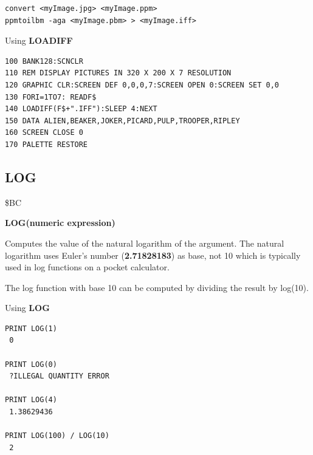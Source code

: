 \begin{description}[leftmargin=2cm,style=nextline]
\begin{verbatim}
convert <myImage.jpg> <myImage.ppm>
ppmtoilbm -aga <myImage.pbm> > <myImage.iff>
\end{verbatim}

\item [Example:] Using {\bf LOADIFF}
\begin{tcolorbox}[colback=black,coltext=white]
\verbatimfont{\codefont}
\begin{verbatim}
100 BANK128:SCNCLR
110 REM DISPLAY PICTURES IN 320 X 200 X 7 RESOLUTION
120 GRAPHIC CLR:SCREEN DEF 0,0,0,7:SCREEN OPEN 0:SCREEN SET 0,0
130 FORI=1TO7: READF$
140 LOADIFF(F$+".IFF"):SLEEP 4:NEXT
150 DATA ALIEN,BEAKER,JOKER,PICARD,PULP,TROOPER,RIPLEY
160 SCREEN CLOSE 0
170 PALETTE RESTORE
\end{verbatim}
\end{tcolorbox}
\end{description}


\newpage
\subsection{LOG}
\begin{description}[leftmargin=2cm,style=nextline]
\item [Token:] \$BC
\item [Format:] {\bf LOG(numeric expression)}
\item [Usage:] Computes
               the value of the natural logarithm of the argument.
               The natural logarithm uses
               Euler's number ({\bf 2.71828183}) as base,
               not 10 which is typically used
               in log functions on a pocket calculator.

\item [Remarks:] The log function with base 10 can be computed
                 by dividing the result by log(10).
\item [Example:] Using {\bf LOG}
\begin{tcolorbox}[colback=black,coltext=white]
\verbatimfont{\codefont}
\begin{verbatim}
PRINT LOG(1)
 0

PRINT LOG(0)
 ?ILLEGAL QUANTITY ERROR

PRINT LOG(4)
 1.38629436

PRINT LOG(100) / LOG(10)
 2
\end{verbatim}
\end{tcolorbox}
\end{description}

